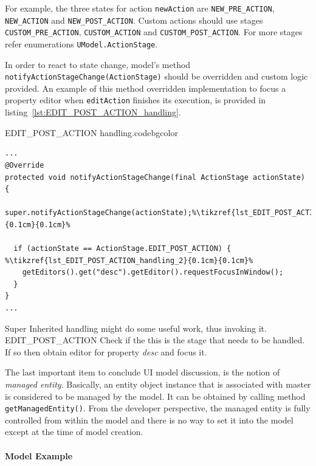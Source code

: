   For example, the three states for action \texttt{newAction} are \texttt{NEW\_PRE\_ACTION}, \texttt{NEW\_ACTION} and \texttt{NEW\_POST\_ACTION}.
  Custom actions should use stages \texttt{CUSTOM\_PRE\_ACTION}, \texttt{CUSTOM\_ACTION} and \texttt{CUSTOM\_POST\_ACTION}. 
  For more stages refer enumerations \texttt{UModel.ActionStage}.
  
  In order to react to state change, model's method \texttt{notifyActionStageChange(ActionStage)} should be overridden and custom logic provided.
  An example of this method overridden implementation to focus a property editor when \texttt{editAction} finishes its execution, is provided in listing~\ref{lst:EDIT_POST_ACTION_handling}.
  
  \begin{code}{EDIT\_POST\_ACTION handling.}{\label{lst:EDIT_POST_ACTION_handling}}{codebgcolor}
    \begin{lstlisting}
...    
@Override    
protected void notifyActionStageChange(final ActionStage actionState) {
  super.notifyActionStageChange(actionState);%\tikzref{lst_EDIT_POST_ACTION_handling_1}{0.1cm}{0.1cm}%
 
  if (actionState == ActionStage.EDIT_POST_ACTION) { %\tikzref{lst_EDIT_POST_ACTION_handling_2}{0.1cm}{0.1cm}%
    getEditors().get("desc").getEditor().requestFocusInWindow();
  }
}
...
    \end{lstlisting}
  \end{code}
    {Super}
    {Inherited handling might do some useful work, thus invoking it.}    
    {EDIT\_POST\_ACTION}
    {Check if the this is the stage that needs to be handled. If so then obtain editor for property \emph{desc} and focus it.}
  
  The last important item to conclude UI model discussion, is the notion of \emph{managed entity}.
  Basically, an entity object instance that is associated with master is considered to be managed by the model.
  It can be obtained by calling method \texttt{getManagedEntity()}.
  From the developer perspective, the managed entity is fully controlled from within the model and there is no way to set it into the model except at the time of model creation.  
  
  \paragraph{Model Example}
  
